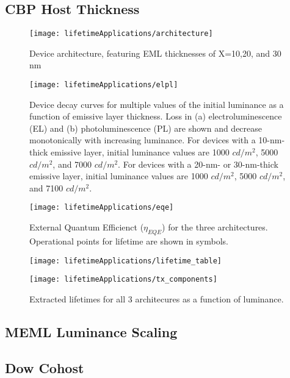 \documentclass[../thesis.tex]{subfiles}
\begin{document}
\subsection{CBP Host Thickness}

\begin{figure}[h]
\centering
\texttt{[image: lifetimeApplications/architecture]}
\caption{Device architecture, featuring EML thicknesses of X=10,20, and 30 nm}
\label{fig:architecture}
\end{figure}

\begin{figure}[h]
\centering
\texttt{[image: lifetimeApplications/elpl]}
\caption{Device decay curves for multiple values of the initial luminance as a function of emissive layer thickness.  Loss in (a) electroluminescence (EL) and (b) photoluminescence (PL) are shown and decrease monotonically with increasing luminance.  For devices with a 10-nm-thick emissive layer, initial luminance values are 1000 $cd/m^2$, 5000 $cd/m^2$, and 7000 $cd/m^2$.  For devices with a 20-nm- or 30-nm-thick emissive layer, initial luminance values are 1000 $cd/m^2$, 5000 $cd/m^2$, and 7100 $cd/m^2$. }
\label{fig:elpl}
\end{figure}

\begin{figure}[h]
\centering
\texttt{[image: lifetimeApplications/eqe]}
\caption{External Quantum Efficienct ($\eta_{EQE}$) for the three architectures.  Operational points for lifetime are shown in symbols.}
\label{fig:eqe}
\end{figure}

\begin{figure}[h]
\centering
\texttt{[image: lifetimeApplications/lifetime\_table]}
\label{fig:lifetime_table}
\end{figure}

\begin{figure}[h]
\centering
\texttt{[image: lifetimeApplications/tx\_components]}
\caption{Extracted lifetimes for all 3 architecures as a function of luminance.}
\label{fig:tx_components}
\end{figure}

\subsection{MEML Luminance Scaling}


\subsection{Dow Cohost}



\end{document}
